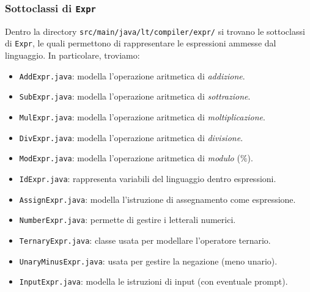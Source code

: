 \documentclass[10pt,a4paper]{article}
\begin{document}
\subsubsection{Sottoclassi di \texttt{Expr}}
Dentro la directory \texttt{src/main/java/lt/compiler/expr/} si trovano le sottoclassi di \texttt{Expr}, le quali permettono di rappresentare le espressioni ammesse dal linguaggio.
In particolare, troviamo:
\begin{itemize}
	\itemsep0em
    \item \texttt{AddExpr.java}: modella l'operazione aritmetica di \textit{addizione}.
    \item \texttt{SubExpr.java}: modella l'operazione aritmetica di \textit{sottrazione}.
    \item \texttt{MulExpr.java}: modella l'operazione aritmetica di \textit{moltiplicazione}.
    \item \texttt{DivExpr.java}: modella l'operazione aritmetica di \textit{divisione}.
    \item \texttt{ModExpr.java}: modella l'operazione aritmetica di \textit{modulo} ($\%$).
    \item \texttt{IdExpr.java}: rappresenta variabili del linguaggio dentro espressioni.
    \item \texttt{AssignExpr.java}: modella l'istruzione di assegnamento come espressione. 
    \item \texttt{NumberExpr.java}: permette di gestire i letterali numerici.
    \item \texttt{TernaryExpr.java}: classe usata per modellare l'operatore ternario.
    \item \texttt{UnaryMinusExpr.java}: usata per gestire la negazione (meno unario). 
    \item \texttt{InputExpr.java}: modella le istruzioni di input (con eventuale prompt).
\end{itemize}
\end{document}
